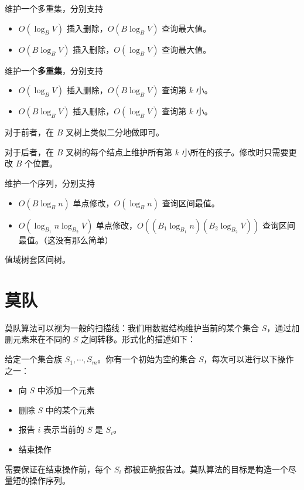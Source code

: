 \begin{example}
    维护一个多重集，分别支持
    \begin{itemize}
        \item $O(\log_B V)$ 插入删除，$O(B\log_B V)$ 查询最大值。
        \item $O(B\log_B V)$ 插入删除，$O(\log_B V)$ 查询最大值。
    \end{itemize}
\end{example}

\begin{example}
    维护一个\textbf{多重集}，分别支持
    \begin{itemize}
        \item $O(\log_B V)$ 插入删除，$O(B\log_B V)$ 查询第 $k$ 小。
        \item $O(B\log_B V)$ 插入删除，$O(\log_B V)$ 查询第 $k$ 小。
    \end{itemize}
\end{example}
\begin{solution}
    对于前者，在 $B$ 叉树上类似二分地做即可。

    对于后者，在 $B$ 叉树的每个结点上维护所有第 $k$ 小所在的孩子。修改时只需要更改 $B$ 个位置。
\end{solution}

\begin{example}
    维护一个序列，分别支持
    \begin{itemize}
        \item $O(B\log_B n)$ 单点修改，$O(\log_B n)$ 查询区间最值。
        \item $O(\log_{B_1} n \log_{B_2}V)$ 单点修改，$O((B_1\log_{B_1} n)(B_2\log_{B_2} V))$ 查询区间最值。（这没有那么简单）
    \end{itemize}
\end{example}
\begin{solution}
    值域树套区间树。
\end{solution}


\section{莫队}

莫队算法可以视为一般的扫描线：我们用数据结构维护当前的某个集合 $S$，通过加删元素来在不同的 $S$ 之间转移。形式化的描述如下：

\begin{definition}[莫队]
    给定一个集合族 $S_1,\cdots,S_m$。你有一个初始为空的集合 $S$，每次可以进行以下操作之一：
    \begin{itemize}
        \item 向 $S$ 中添加一个元素
        \item 删除 $S$ 中的某个元素
        \item 报告 $i$ 表示当前的 $S$ 是 $S_i$。
        \item 结束操作
    \end{itemize}
    需要保证在结束操作前，每个 $S_i$ 都被正确报告过。莫队算法的目标是构造一个尽量短的操作序列。
\end{definition}

